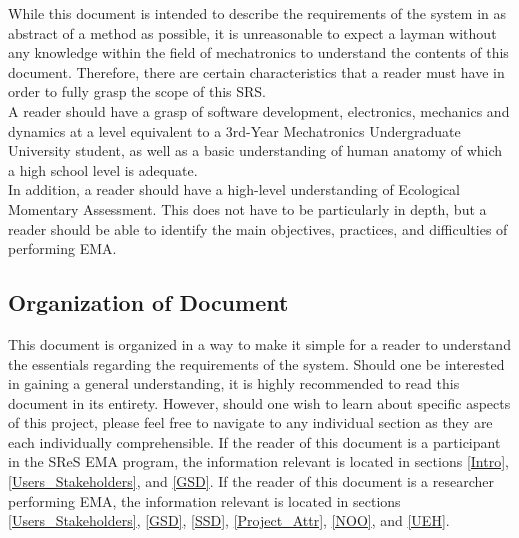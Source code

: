 \documentclass[12pt]{article}
\begin{document}
While this document is intended to describe the requirements of the system in as abstract of a method as possible, it is unreasonable to expect a layman without any knowledge within the field of mechatronics to understand the contents of this document. Therefore, there are certain characteristics that a reader must have in order to fully grasp the scope of this SRS. \\

A reader should have a grasp of software development, electronics, mechanics and dynamics at a level equivalent to a 3rd-Year Mechatronics Undergraduate University student, as well as a basic understanding of human anatomy of which a high school level is adequate. \\

In addition, a reader should have a high-level understanding of Ecological Momentary Assessment. This does not have to be particularly in depth, but a reader should be able to identify the main objectives, practices, and difficulties of performing EMA. \\

\subsection{Organization of Document}
This document is organized in a way to make it simple for a reader to understand the essentials regarding the requirements of the system. Should one be interested in gaining a general understanding, it is highly recommended to read this document in its entirety. However, should one wish to learn about specific aspects of this project, please feel free to navigate to any individual section as they are each individually comprehensible. If the reader of this document is a participant in the SReS EMA program, the information relevant is located in sections \ref{Intro}, \ref{Users_Stakeholders}, and \ref{GSD}. If the reader of this document is a researcher performing EMA, the information relevant is located in sections \ref{Users_Stakeholders}, \ref{GSD}, \ref{SSD}, \ref{Project_Attr}, \ref{NOO}, and \ref{UEH}.\\ 



\end{document}

